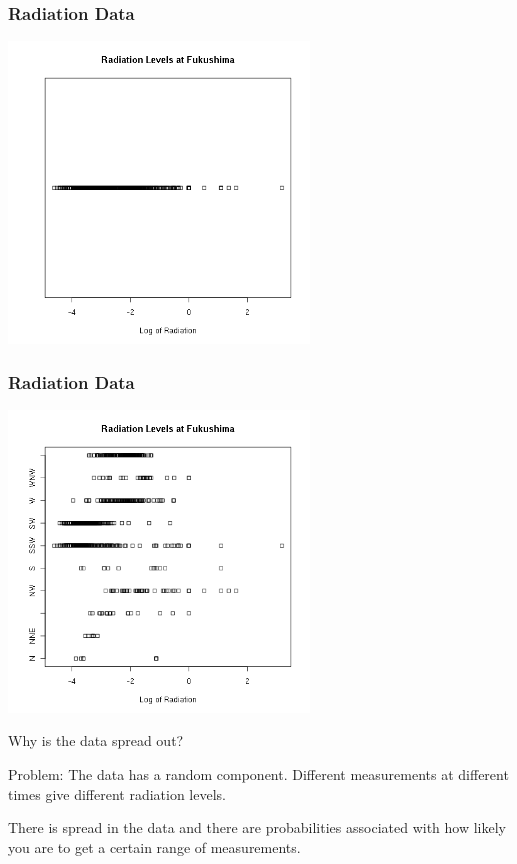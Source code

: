 \begin{frame}
  \frametitle{Radiation Data}

  \begin{center}
    \includegraphics[width=8cm]{img/logFukushimaGamma}
  \end{center}  

\end{frame}

\begin{frame}
  \frametitle{Radiation Data}

  \begin{center}
    \includegraphics[width=8cm]{img/logFukushimaGammaByDirection}
  \end{center}  

\end{frame}


\begin{frame}{Why is the data spread out?}

  Problem: The data has a random component. Different measurements at
  different times give different radiation levels. 

  \vfill

  There is spread in the data and there are probabilities associated
  with how likely you are to get a certain range of measurements.

  \vfill
  
\end{frame}


